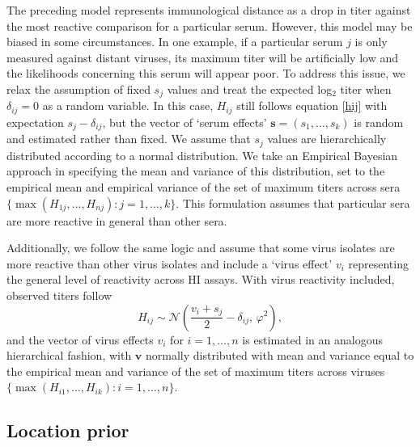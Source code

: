 \documentclass[11pt,oneside,letterpaper]{article}
\newcommand{\ve}{v}									%
\newcommand{\se}{s}									%
\newcommand{\ves}{\mathbf{v}}						%
\newcommand{\ses}{\mathbf{s}}						%
\newcommand{\mdssd}{\varphi}						%
\newcommand{\vn}{n}									%
\newcommand{\sn}{k}									%
\newcommand{\normal}{\mathcal{N}}					%
\begin{document}
The preceding model represents immunological distance as a drop in titer against the most reactive comparison for a particular serum.
However, this model may be biased in some circumstances.
In one example, if a particular serum $j$ is only measured against distant viruses, its maximum titer will be artificially low and the likelihoods concerning this serum will appear poor. 
To address this issue, we relax the assumption of fixed $\se_j$ values and treat the expected log$_2$ titer when $\delta_{ij}=0$ as a random variable.
In this case, $H_{ij}$ still follows equation \ref{hij} with expectation $\se_j - \delta_{ij}$, but the vector of `serum effects' $\ses = (\se_1,\ldots,\se_{\sn})$ is random and estimated rather than fixed.
We assume that $\se_j$ values are hierarchically distributed according to a normal distribution.   
We take an Empirical Bayesian approach in specifying the mean and variance of this distribution, set to the empirical mean and empirical variance of the set of maximum titers across sera $\{ \max ( H_{1j},\ldots,H_{\vn j} ) : j = 1,\ldots,\sn \}$.
This formulation assumes that particular sera are more reactive in general than other sera.

Additionally, we follow the same logic and assume that some virus isolates are more reactive than other virus isolates and include a `virus effect' $\ve_i$ representing the general level of reactivity across HI assays. 
With virus reactivity included, observed titers follow
\begin{equation}
	H_{ij} \sim \normal \left( \frac{\ve_i+\se_j}{2} - \delta_{ij}, \, \mdssd^2 \right),
\end{equation}
and the vector of virus effects $\ve_i$ for $i = 1,\ldots, \vn$ is estimated in an analogous hierarchical fashion, with $\ves$ normally distributed with mean and variance equal to the empirical mean and variance of the set of maximum titers across viruses $\{ \max ( H_{i1},\ldots,H_{i \sn} ) : i = 1,\ldots,\vn \}$.

\subsection*{Location prior}
\end{document}
